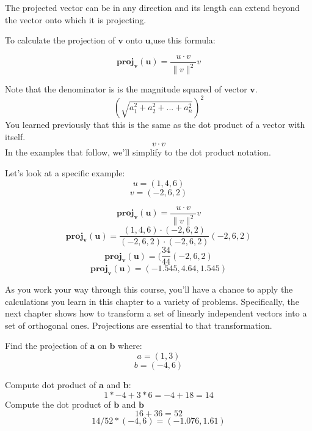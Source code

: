 
The projected vector can be in any direction and its length can extend beyond the vector onto which it is projecting.


To calculate the projection of 
$\mathbf{v}$ onto $\mathbf{u}$,use this formula:

$$\mathbf{proj}_\mathbf{v}(\mathbf{u}) = \frac{u\cdot v}{\parallel{v}\parallel ^2}v$$

Note that the denominator is is the magnitude squared of vector $\mathbf{v}$.
$$(\sqrt{a_1^2 + a_2^2 + ... + a_n^2} )^2$$
You learned previously that this is the same as the dot product of a vector with itself.
$${v\cdot v}$$
In the examples that follow, we'll simplify to the dot product notation.

Let's look at a specific example:
$$u = (1,4,6)$$ 
$$v = (-2,6,2)$$ 

$$\mathbf{proj}_\mathbf{v}(\mathbf{u}) = \frac{u\cdot v}{\parallel {v}\parallel ^2}v$$
$$\mathbf{proj}_\mathbf{v}(\mathbf{u}) = \frac{(1,4,6)\cdot(-2,6,2)}{ (-2,6,2)\cdot (-2,6,2)}(-2,6,2)$$
$$\mathbf{proj}_\mathbf{v}(\mathbf{u}) = (\frac{34}{44}(-2,6,2)$$
$$\mathbf{proj}_\mathbf{v}(\mathbf{u}) = (-1.545, 4.64, 1.545)$$

As you work your way through this course, you'll have a chance to apply the calculations you learn in this chapter to a variety of problems. Specifically, the next chapter shows how to transform a set of linearly independent vectors into a set of orthogonal ones. Projections are essential to that transformation. 

\begin{Exercise}[title={Projections}, label=projections]
	Find the projection of $\mathbf{a}$ on $\mathbf{b}$ where:
	$$a = (1,3)$$
	$$b = (-4,6)$$
\end{Exercise}
\begin{Answer}[ref=project_vector]
	Compute dot product of $\mathbf{a}$ and $\mathbf{b}$:
	$$1*-4 + 3*6 = -4 +18 = 14$$
	Compute the dot product of $\mathbf{b}$ and $\mathbf{b}$
	$$16 + 36 = 52 $$
	$$14/52 * (-4,6) = (-1.076 , 1.61)$$
\end{Answer}
 
